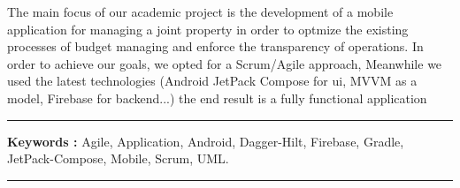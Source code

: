 The main focus of our academic project is the development of a mobile application for managing a joint property in order to optmize the existing processes of budget managing and enforce the transparency of operations. In order to achieve our goals, we opted for a Scrum/Agile approach, Meanwhile we used the latest technologies (Android JetPack Compose for ui, MVVM as a model, Firebase for backend...) the end result is a fully functional application

\vfill
\hrule
\vspace{0.5cm}
\textbf{Keywords : } Agile, Application, Android, Dagger-Hilt, Firebase, Gradle, JetPack-Compose, Mobile, Scrum, UML.
\vspace{0.5cm}
\hrule
